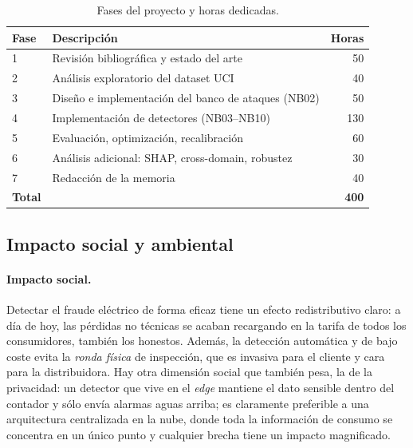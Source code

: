 \begin{table}[H]
\centering
\caption{Fases del proyecto y horas dedicadas.}
\label{tab:gantt}
\small
\begin{tabularx}{\textwidth}{l X r}
\toprule
Fase & Descripción & Horas \\
\midrule
1 & Revisión bibliográfica y estado del arte & 50 \\
2 & Análisis exploratorio del dataset UCI    & 40 \\
3 & Diseño e implementación del banco de ataques (NB02) & 50 \\
4 & Implementación de detectores (NB03--NB10)           & 130 \\
5 & Evaluación, optimización, recalibración             & 60 \\
6 & Análisis adicional: SHAP, cross-domain, robustez    & 30 \\
7 & Redacción de la memoria                              & 40 \\
\midrule
\textbf{Total}  &                                                  & \textbf{400} \\
\bottomrule
\end{tabularx}
\end{table}

\subsection{Impacto social y ambiental}

\paragraph{Impacto social.} Detectar el fraude eléctrico de forma eficaz tiene un efecto redistributivo claro: a día de hoy, las pérdidas no técnicas se acaban recargando en la tarifa de todos los consumidores, también los honestos. Además, la detección automática y de bajo coste evita la \textit{ronda física} de inspección, que es invasiva para el cliente y cara para la distribuidora. Hay otra dimensión social que también pesa, la de la privacidad: un detector que vive en el \textit{edge} mantiene el dato sensible dentro del contador y sólo envía alarmas aguas arriba; es claramente preferible a una arquitectura centralizada en la nube, donde toda la información de consumo se concentra en un único punto y cualquier brecha tiene un impacto magnificado.

